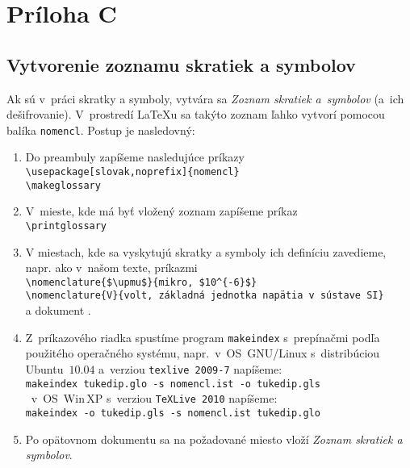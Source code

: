\section*{Príloha C}
\subsection*{Vytvorenie zoznamu skratiek a symbolov}

Ak sú v~práci skratky a symboly, vytvára sa \emph{Zoznam skratiek
a~symbolov} (a~ich dešifrovanie). V~prostredí \LaTeX{}u sa takýto
zoznam
ľahko vytvorí pomocou balíka \verb+nomencl+. Postup je nasledovný:
\begin{enumerate}
\item Do preambuly zapíšeme nasledujúce príkazy\\
\verb+\usepackage[slovak,noprefix]{nomencl}+\\ \verb+\makeglossary+
\item  V~mieste, kde má byť vložený zoznam zapíšeme príkaz\\
\verb+\printglossary+
\item V miestach, kde sa vyskytujú skratky a symboly ich definíciu
zavedieme, napr. ako     	v~našom texte, príkazmi\\
\verb+\nomenclature{$\upmu$}{mikro, $10^{-6}$}+\\
\verb+\nomenclature{V}{volt, základná jednotka napätia v sústave SI}+\\
a dokument .
\item Z~príkazového riadka spustíme program \verb+makeindex+
s~prepínačmi podľa použitého operačného systému, napr.~v~OS~GNU/Linux
s~distribúciou Ubuntu~$10.04$ a~verziou \verb+texlive 2009-7+
napíšeme:\\
\verb*+makeindex tukedip.glo -s nomencl.ist -o tukedip.gls+\\
~v~OS~Win\,XP s~verziou \verb+TeXLive 2010+
napíšeme:\\
\verb*+makeindex -o tukedip.gls -s nomencl.ist tukedip.glo+

\item Po opätovnom  dokumentu sa na
požadované
miesto vloží \emph{Zoznam skratiek a symbolov}.
\end{enumerate}
